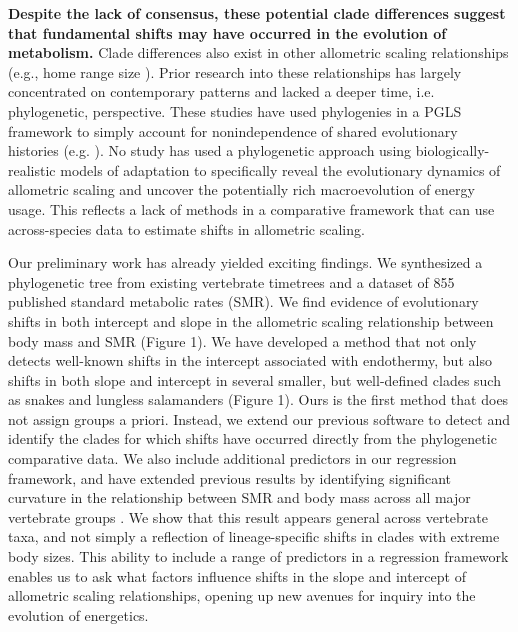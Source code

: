 \documentclass[10pt, a4paper]{article}
\begin{document}
\textbf{Despite the lack of consensus, these potential clade differences suggest that fundamental shifts may have occurred in the evolution of metabolism.} Clade differences also exist in other allometric scaling relationships (e.g., home range size \cite{Tucker2014}). Prior research into these relationships has largely concentrated on contemporary patterns and lacked a deeper time, i.e. phylogenetic, perspective. These studies have used phylogenies in a PGLS framework to simply account for nonindependence of shared evolutionary histories (e.g. \cite{Sieg2009, Capellini2010}). No study has used a phylogenetic approach using biologically-realistic models of adaptation to specifically reveal the evolutionary dynamics of allometric scaling and uncover the potentially rich macroevolution of energy usage. This reflects a lack of methods in a comparative framework that can use across-species data to estimate shifts in allometric scaling.  \

Our preliminary work has already yielded exciting findings. We synthesized a phylogenetic tree from existing vertebrate timetrees and a dataset of 855 published standard metabolic rates (SMR). We find evidence of evolutionary shifts in both intercept and slope in the allometric scaling relationship between body mass and SMR (Figure 1). We have developed a method that not only detects well-known shifts in the intercept associated with endothermy, but also shifts in both slope and intercept in several smaller, but well-defined clades such as snakes and lungless salamanders (Figure 1). Ours is the first method that does not assign groups a priori. Instead, we extend our previous software \cite{UyedaHarmon2014} to detect and identify the clades for which shifts have occurred directly from the phylogenetic comparative data. We also include additional predictors in our regression framework, and have extended previous results by identifying significant curvature in the relationship between SMR and body mass across all major vertebrate groups \cite{Kolokotrones2010}. We show that this result appears general across vertebrate taxa, and not simply a reflection of lineage-specific shifts in clades with extreme body sizes. This ability to include a range of predictors in a regression framework enables us to ask what factors influence shifts in the slope and intercept of allometric scaling relationships, opening up new avenues for inquiry into the evolution of energetics.
\end{document}
